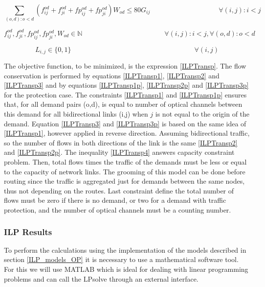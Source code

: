 \begin{equation}
\sum_{(o,d):o<d} \left(f_{ij}^{od} + f_{ji}^{od} + fp_{ij}^{od} + fp_{ji}^{od}\right) W_{od} \leq 80 G_{ij} \qquad \qquad \qquad \qquad \qquad
\forall(i,j) : i < j
\label{ILPTransp4}
\end{equation}

\begin{equation}
f_{ij}^{od} , f_{ji}^{od} , fp_{ij}^{od} , fp_{ji}^{od} , W_{od} \in \mathbb{N}   \qquad \qquad \qquad \qquad \qquad \qquad
\forall(i,j) : i < j, \forall(o,d) : o < d
\label{ILPTransp5}
\end{equation}

\begin{equation}
L_{i,j} \in \{0,1\} \qquad \qquad \qquad \qquad \qquad \qquad \qquad \qquad \qquad
\forall(i,j)
\label{ILPTranspL1}
\end{equation}

The objective function, to be minimized, is the expression \ref{ILPTransp}. The flow conservation is performed by equations \ref{ILPTransp1}, \ref{ILPTransp2} and \ref{ILPTransp3} and by equations \ref{ILPTransp1p}, \ref{ILPTransp2p} and \ref{ILPTransp3p} for the protection case. The constraints \ref{ILPTransp1} and \ref{ILPTransp1p} ensures that, for all demand pairs (o,d), is equal to number of optical channels between this demand for all bidirectional links (i,j) when $j$ is not equal to the origin of the demand. Equation \ref{ILPTransp3} and \ref{ILPTransp3p} is based on the same idea of \ref{ILPTransp1}, however applied in reverse direction. Assuming bidirectional traffic, so the number of flows in both directions of the link is the same \ref{ILPTransp2} and \ref{ILPTransp2p}. The inequality \ref{ILPTransp4} answers capacity constraint problem. Then, total flows times the traffic of the demands must be less or equal to the capacity of network links. The grooming of this model can be done before routing since the traffic is aggregated just for demands between the same nodes, thus not depending on the routes. Last constraint define the total number of flows must be zero if there is no demand, or two for a demand with traffic protection, and the number of optical channels must be a counting number.

\subsubsection{ILP Results}

To perform the calculations using the implementation of the models described in section \ref{ILP_models_OP} it is necessary to use a mathematical software tool. For this we will use MATLAB which is ideal for dealing with linear programming problems and can call the LPsolve through an external interface. \\


